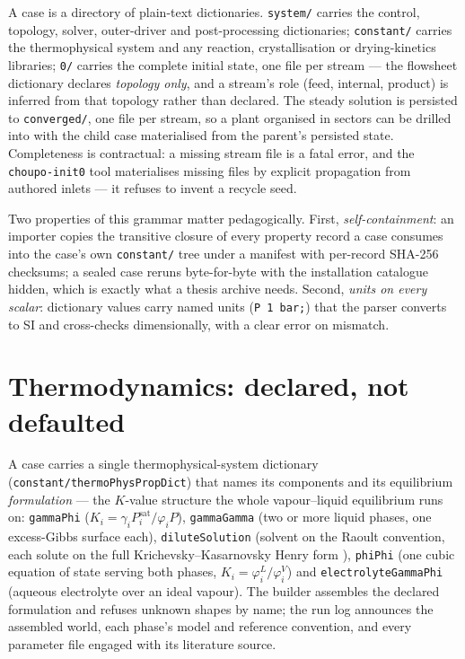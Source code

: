 \documentclass[11pt,a4paper]{article}
\newcommand{\code}[1]{\texttt{#1}}
\begin{document}
A case is a directory of plain-text dictionaries.  \code{system/} carries
the control, topology, solver, outer-driver and post-processing
dictionaries; \code{constant/} carries the thermophysical system and any
reaction, crystallisation or drying-kinetics libraries; \code{0/} carries
the complete initial state, one file per stream --- the flowsheet
dictionary declares \emph{topology only}, and a stream's role (feed,
internal, product) is inferred from that topology rather than declared.
The steady solution is persisted to \code{converged/}, one file per
stream, so a plant organised in sectors can be drilled into with the
child case materialised from the parent's persisted state.  Completeness
is contractual: a missing stream file is a fatal error, and the
\code{choupo-init0} tool materialises missing files by explicit
propagation from authored inlets --- it refuses to invent a recycle seed.

Two properties of this grammar matter pedagogically.  First,
\emph{self-containment}: an importer copies the transitive closure of
every property record a case consumes into the case's own
\code{constant/} tree under a manifest with per-record SHA-256 checksums;
a sealed case reruns byte-for-byte with the installation catalogue hidden,
which is exactly what a thesis archive needs.  Second, \emph{units on
every scalar}: dictionary values carry named units (\code{P 1 bar;}) that
the parser converts to SI and cross-checks dimensionally, with a clear
error on mismatch.

\section{Thermodynamics: declared, not defaulted}

A case carries a single thermophysical-system dictionary
(\code{constant/thermoPhysPropDict}) that names its components and its
equilibrium \emph{formulation} --- the $K$-value structure the whole
vapour--liquid equilibrium runs on: \code{gammaPhi}
($K_i=\gamma_iP^{\mathrm{sat}}_i/\varphi_iP$), \code{gammaGamma} (two or
more liquid phases, one excess-Gibbs surface each), \code{diluteSolution}
(solvent on the Raoult convention, each solute on the full
Krichevsky--Kasarnovsky Henry form \citep{krichevsky1935}), \code{phiPhi}
(one cubic equation of state serving both phases,
$K_i=\varphi^L_i/\varphi^V_i$) and \code{electrolyteGammaPhi} (aqueous
electrolyte over an ideal vapour).  The builder assembles the declared
formulation and refuses unknown shapes by name; the run log announces the
assembled world, each phase's model and reference convention, and every
parameter file engaged with its literature source.
\end{document}
